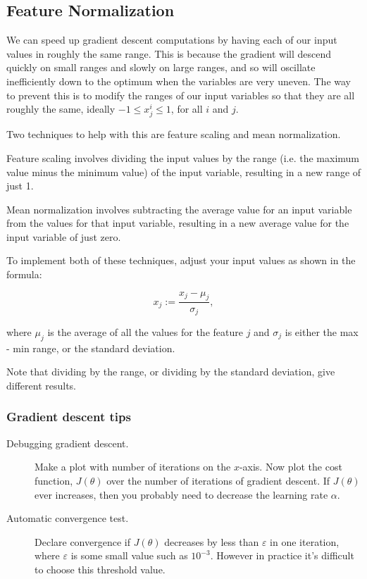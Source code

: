 \documentclass[a4paper,11pt]{report}
\begin{document}
\subsection*{Feature Normalization}

We can speed up gradient descent computations by having each of our input values in roughly the same range. This is because the gradient will descend quickly on small ranges and slowly on large ranges, and so will oscillate inefficiently down to the optimum when the variables are very uneven.
The way to prevent this is to modify the ranges of our input variables so that they are all roughly the same, ideally $−1\leq x^i_j \leq 1$, for all $i$ and $j$.

Two techniques to help with this are feature scaling and mean normalization.

Feature scaling involves dividing the input values by the range (i.e. the maximum value minus the minimum value) of the input variable, resulting in a new range of just 1.

Mean normalization involves subtracting the average value for an input variable from the values for that input variable, resulting in a new average value for the input variable of just zero.

To implement both of these techniques, adjust your input values as shown in the formula:

$$x_j := \dfrac{x_j - \mu_j}{\sigma_j},$$

where $\mu_j$ is the average of all the values for the feature $j$ and $\sigma_j$ is either the max - min range, or the standard deviation.

Note that dividing by the range, or dividing by the standard deviation, give different results.

\subsubsection*{Gradient descent tips}

\begin{description}
  \item[Debugging gradient descent.]  Make a plot with number of iterations on the $x$-axis. Now plot the cost function, $J(\theta)$ over the number of iterations of gradient descent. If $J(\theta)$ ever increases, then you probably need to decrease the learning rate $\alpha$.
  \item[Automatic convergence test.] Declare convergence if $J(\theta)$ decreases by less than $\varepsilon$ in one iteration, where $\varepsilon$ is some small value such as $10^{-3}$. However in practice it's difficult to choose this threshold value.
\end{description}
\end{document}
